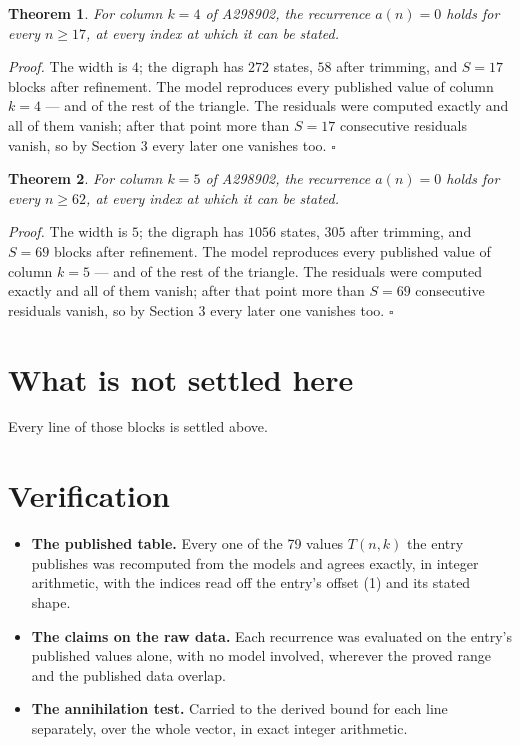 \documentclass[11pt]{article}
\newtheorem{theorem}{Theorem}
\theoremstyle{definition}
\begin{document}
\begin{theorem} For column $k = 4$ of A298902, the recurrence $a(n) = 0$ holds for every $n \ge 17$, at every index at which it can be stated.\end{theorem}

{\itshape Proof.} The width is $4$; the digraph has $272$ states, $58$ after trimming, and $S = 17$ blocks after refinement. The model reproduces every published value of column $k = 4$ --- and of the rest of the triangle. The residuals were computed exactly and all of them vanish; after that point more than $S = 17$ consecutive residuals vanish, so by Section 3 every later one vanishes too. $\square$

\begin{theorem} For column $k = 5$ of A298902, the recurrence $a(n) = 0$ holds for every $n \ge 62$, at every index at which it can be stated.\end{theorem}

{\itshape Proof.} The width is $5$; the digraph has $1056$ states, $305$ after trimming, and $S = 69$ blocks after refinement. The model reproduces every published value of column $k = 5$ --- and of the rest of the triangle. The residuals were computed exactly and all of them vanish; after that point more than $S = 69$ consecutive residuals vanish, so by Section 3 every later one vanishes too. $\square$

\section{What is not settled here}

Every line of those blocks is settled above.

\section{Verification}

\begin{itemize}

\item {\bfseries The published table.} Every one of the 79 values $T(n,k)$ the entry publishes was recomputed from the models and agrees exactly, in integer arithmetic, with the indices read off the entry's offset (1) and its stated shape.

\item {\bfseries The claims on the raw data.} Each recurrence was evaluated on the entry's published values alone, with no model involved, wherever the proved range and the published data overlap.

\item {\bfseries The annihilation test.} Carried to the derived bound for each line separately, over the whole vector, in exact integer arithmetic.

\end{itemize}
\end{document}
